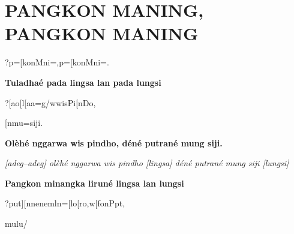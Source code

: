
\chapter{PANGKON MANING, PANGKON MANING}
\begin{center}

{\jawa ?p=[konMni=,p=[konMni=.}

\end{center}



\begin{center}
\textbf{Tuladha\'{e} pada lingsa lan pada lungsi}

{\jawa ?[ao[l}{\jawauc {}}{\jawa [aa=g/wwisPi[nDo,}

{\jawa [f[nput][nmu=siji.} 

\textbf{Ol\`{e}h\'{e} nggarwa wis pindho, d\'{e}n\'{e} putran\'{e} mung siji.}

\textit{[adeg--adeg] ol\`{e}h\'{e} nggarwa wis pindho [lingsa] d\'{e}n\'{e} putran\'{e} mung siji [lungsi]}
\end{center}

\begin{center}
\textbf{Pangkon minangka lirun\'{e} lingsa lan lungsi}

{\jawa ?put][nnenem\pangkon ln=[lo[ro,w[fonPpt\pangkon,} 

{\jawa mulu/}
\end{center}





